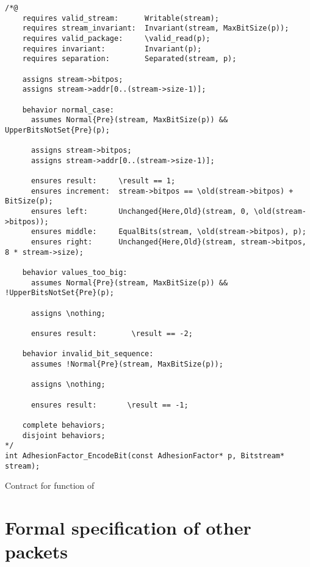 \begin{listing}[hbt]
\begin{minipage}{0.99\textwidth}
\begin{lstlisting}[style=acsl-block]
/*@
    requires valid_stream:      Writable(stream);
    requires stream_invariant:  Invariant(stream, MaxBitSize(p));
    requires valid_package:     \valid_read(p);
    requires invariant:         Invariant(p);
    requires separation:        Separated(stream, p);

    assigns stream->bitpos;
    assigns stream->addr[0..(stream->size-1)];

    behavior normal_case:
      assumes Normal{Pre}(stream, MaxBitSize(p)) && UpperBitsNotSet{Pre}(p);

      assigns stream->bitpos;
      assigns stream->addr[0..(stream->size-1)];

      ensures result:     \result == 1;
      ensures increment:  stream->bitpos == \old(stream->bitpos) + BitSize(p);
      ensures left:       Unchanged{Here,Old}(stream, 0, \old(stream->bitpos));
      ensures middle:     EqualBits(stream, \old(stream->bitpos), p);
      ensures right:      Unchanged{Here,Old}(stream, stream->bitpos, 8 * stream->size);

    behavior values_too_big:
      assumes Normal{Pre}(stream, MaxBitSize(p)) && !UpperBitsNotSet{Pre}(p);

      assigns \nothing;

      ensures result:        \result == -2;

    behavior invalid_bit_sequence:
      assumes !Normal{Pre}(stream, MaxBitSize(p));

      assigns \nothing;

      ensures result:       \result == -1;

    complete behaviors;
    disjoint behaviors;
*/
int AdhesionFactor_EncodeBit(const AdhesionFactor* p, Bitstream* stream);
\end{lstlisting}
\end{minipage}
\caption{\label{lst:adhesionfactor-encodebit}Contract for  function of }
\end{listing}

\FloatBarrier

\section{Formal specification of other packets}
\label{sec:other-packets}

